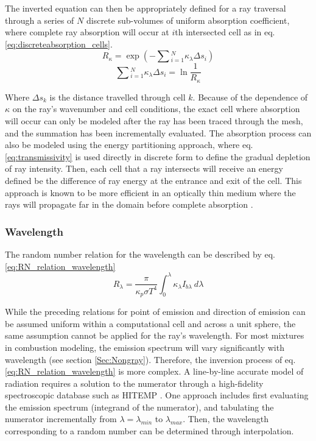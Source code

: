 The inverted equation can then be appropriately defined for a ray traversal through a series of $N$ discrete sub-volumes of uniform absorption coefficient, where complete ray absorption will occur at $i$th intersected cell as in eq. \ref{eq:discreteabsorption_cells}.
\begin{equation}
    R_\kappa{}=\exp{\left(-\sum{}_{i=1}^N\kappa_\lambda{}\Delta{}s_i\right)}
\end{equation}
\begin{equation}
    \sum{}_{i=1}^N\kappa_\lambda{}\Delta{s_i}=\ln{\frac{1}{R_\kappa{}}}
    \label{eq:discreteabsorption_cells}
\end{equation}

Where $\Delta{s_k}$ is the distance travelled through cell $k$. Because of the dependence of $\kappa{}$ on the ray's wavenumber and cell conditions, the exact cell where absorption will occur can only be modeled after the ray has been traced through the mesh, and the summation has been incrementally evaluated.
The absorption process can also be modeled using the energy 
partitioning approach, where eq. \ref{eq:transmissivity} is used directly in discrete form to define the gradual depletion of ray intensity. 
Then, each cell that a ray intersects will receive an energy defined be the difference of ray energy at the entrance and exit of the cell.
This approach is known to be more efficient in an optically thin medium where the rays will propagate far in the domain before complete absorption \cite{Modest2013RadiativeTransfer,Liu2020TheFlames}.

\subsubsection{Wavelength}
The random number relation for the wavelength can be described by eq. \ref{eq:RN_relation_wavelength}
\begin{equation}
    R_\lambda{}=\frac{\pi{}}{\kappa{}_p\sigma{}T^4}\int_0^\lambda{}\kappa{}_\lambda{}I_{b\lambda{}}~d\lambda{}
    \label{eq:RN_relation_wavelength}
\end{equation}

While the preceding relations for point of emission and direction of emission can be assumed uniform within a computational cell and across a unit sphere, the same assumption cannot be applied for the ray's wavelength. For most mixtures in combustion modeling, the emission spectrum will vary significantly with wavelength (see section \ref{Sec:Nongray}). 
Therefore, the inversion process of eq. \ref{eq:RN_relation_wavelength} is more complex.
A line-by-line accurate model of radiation requires a solution to the numerator through a high-fidelity spectroscopic database such as HITEMP \cite{Rothman2010HITEMPDatabase}.
One approach includes first evaluating the emission spectrum (integrand of the numerator), and tabulating the numerator incrementally from $\lambda{}=\lambda{}_{min}$ to $\lambda{}_{max}$.
Then, the wavelength corresponding to a random number can be determined through interpolation.

